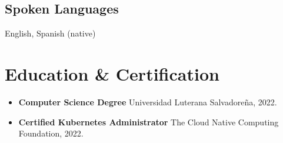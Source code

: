 \documentclass[letterpaper]{article}
\begin{document}
\subsection{Spoken Languages}

English, Spanish (native)

\section{Education \& Certification}

\begin{itemize}
	\item \textbf{Computer Science Degree} \newline Universidad Luterana Salvadoreña, 2022.

	\item \textbf{Certified Kubernetes Administrator} \newline The Cloud Native Computing Foundation, 2022.
\end{itemize}
\end{document}
